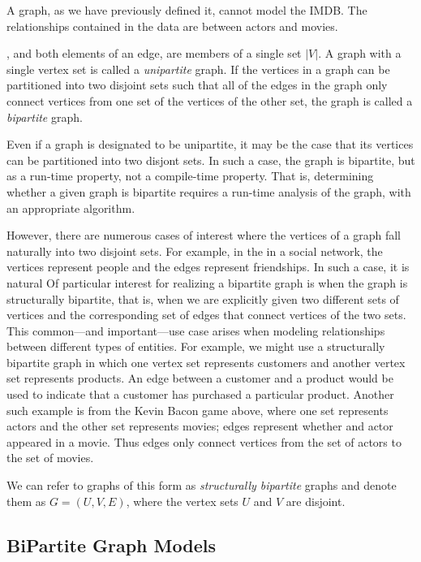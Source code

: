 A graph, as we have previously defined it, cannot model the IMDB.  The relationships
contained in the data are between actors and movies.



, and both elements of an
edge, are members of a single set $|V|$. A graph with a single vertex set is called a
\emph{unipartite} graph. If the vertices in a graph can be partitioned into two
disjoint sets such that all of the edges in the graph only connect vertices from one
set of the vertices of the other set, the graph is called a \emph{bipartite} graph.

Even if a graph is designated to be unipartite, it may be the case that its vertices
can be partitioned into two disjont sets. In such a case, the graph is bipartite,
but as a run-time property, not a compile-time property.
That is, determining whether a given graph is bipartite requires a run-time analysis
of the graph, with an appropriate algorithm.

However, there are numerous cases of interest where the vertices of a graph fall
naturally into two disjoint sets. For example, in the
in a social network, the vertices
represent people and the edges represent friendships. In such a case, it is natural
Of particular interest for realizing a bipartite graph is when the graph is
structurally bipartite, that is, when we are explicitly given two different
sets of vertices and the corresponding set of edges that connect vertices of the two sets.
This common---and important---use case arises when modeling relationships
between different types of entities. For example, we might use a structurally
bipartite graph in which one vertex set represents customers and another vertex
set represents products. An edge between a customer and a product would be used
to indicate that a customer has purchased a particular product.
Another such example is from the Kevin Bacon game above, where
one set represents actors and the other set represents movies; edges represent whether
and actor appeared in a movie. Thus edges only connect vertices from the set of actors
to the set of movies.

We can refer to graphs of this form as \emph{structurally bipartite} graphs and
denote them as $G = (U, V, E)$, where the vertex sets $U$ and $V$ are disjoint.

\subsection{BiPartite Graph Models}

